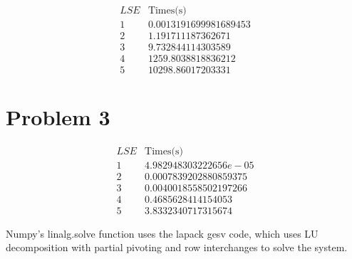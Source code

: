 \documentclass[11pt,letterpaper]{article}
\begin{document}
\[
\begin{array}{cc}
LSE & \text{Times(s)} \\
1 & 0.0013191699981689453 \\
2 & 1.191711187362671 \\
3 & 9.732844114303589 \\
4 & 1259.8038818836212 \\
5 & 10298.86017203331
\end{array}
\]

\section*{Problem 3}

\[
\begin{array}{cc}
LSE & \text{Times(s)} \\
1 & 4.982948303222656e-05 \\
2 & 0.0007839202880859375 \\
3 & 0.0040018558502197266 \\
4 & 0.4685628414154053 \\
5 & 3.8332340717315674
\end{array}
\]

Numpy's linalg.solve function uses the lapack gesv code, which uses LU decomposition with partial pivoting and row interchanges to solve the system.
\end{document}
